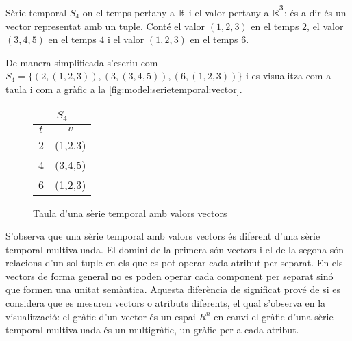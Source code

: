 \begin{example}
  Sèrie temporal $S_4$ on el temps pertany a $\bar{\mathbb{R}{}}$ i el valor
  pertany a $\bar{\mathbb{R}{}}^3$; és a dir és un vector representat amb un
  tuple. Conté el valor $(1,2,3)$ en el temps $2$, el valor $(3,4,5)$
  en el temps $4$ i el valor $(1,2,3)$ en el temps $6$.

De manera simplificada s'escriu com $S_4 = \{ (2,(1,2,3)),
(3,(3,4,5)), (6,(1,2,3)) \}$ i es visualitza com a taula i com a
gràfic a la \autoref{fig:model:serietemporal:vector}.

\begin{figure}[tp]
  \centering
  \begin{tabular}{|c|c|}
    \multicolumn{2}{c}{$S_4$} \\ \hline
    $t$  & $v$ \\ \hline
    2  & (1,2,3) \\
    4  & (3,4,5) \\
    6  & (1,2,3) \\ \hline
  \end{tabular} \qquad
    \caption{Taula d'una sèrie temporal amb valors vectors}
  \label{fig:model:serietemporal:vector}
\end{figure}



S'observa que una sèrie temporal amb valors vectors és diferent d'una
sèrie temporal multivaluada. El domini de la primera són vectors i el
de la segona són relacions d'un sol tuple en els que es pot operar
cada atribut per separat. En els vectors de forma general no es poden
operar cada component per separat sinó que formen una unitat
semàntica. Aquesta diferència de significat prové de si es considera
que es mesuren vectors o atributs diferents, el qual s'observa en la
visualització: el gràfic d'un vector és un espai $R^n$ en canvi el
gràfic d'una sèrie temporal multivaluada és un multigràfic, un gràfic
per a cada atribut.

\end{example}


